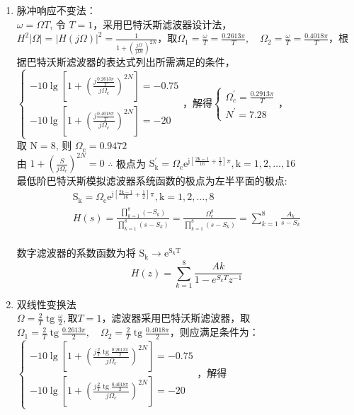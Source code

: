 \documentclass{seuer}
\begin{document}
\begin{enumerate}
	\item 脉冲响应不变法：\\$\omega=\Omega T$, 令 $T=1$，采用巴特沃斯滤波器设计法，$H^2|\Omega|=|H(j \Omega)|^2=\frac{1}{1+\left(\frac{j \Omega}{j \Omega c}\right)^{2 N}}$，取$\Omega_1=\frac{\omega}{T}=\frac{0.2613 \pi}{T}, \quad \Omega_2=\frac{\omega}{T}=\frac{0.4018 \pi}{T}$，根据巴特沃斯滤波器的表达式列出所需满足的条件，\\$\left\{\begin{array}{l}-10 \lg \left[1+\left(\frac{j \frac{0.2613 \pi}{T}}{j \Omega_c}\right)^{2 N}\right]=-0.75 \\ -10 \lg \left[1+\left(\frac{j \frac{0.4018 \pi}{T}}{j \Omega_c}\right)^{2 N}\right]=-20\end{array}\right.$，解得$\left\{\begin{array}{l}\Omega^{\prime}_c=\frac{0.2913 \pi}{T} \\ N^{\prime}=7.28\end{array}\right.$，\\取 $\mathrm{N}=8$, 则 $\Omega_\mathrm{c}=0.9472$
	\\由 $1+\left(\frac{S}{j \Omega_c}\right)^{2 N}=0$
	$\therefore$ 极点为 $\mathrm{S}_{\mathrm{k}}^{\prime}=\Omega_{\mathrm{c}} \mathrm{e}^{\mathrm{j}\left[\frac{2 \mathrm{k}-1}{16}+\frac{1}{2}\right] \pi}, \mathrm{k}=1,2, \ldots,16$
	\\最低阶巴特沃斯模拟滤波器系统函数的极点为左半平面的极点:
	$$
	\begin{gathered}
		\mathrm{S}_{\mathrm{k}}=\Omega_{\mathrm{c}} \mathrm{e}^{\mathrm{j}\left[\frac{2 \mathrm{k}-1}{16}+\frac{1}{2}\right] \pi}, \mathrm{k}=1,2, \ldots, 8 \\
		H(s)=\frac{\prod_{k=1}^8(-S_k)}{\prod_{k=1}^8(s-S_k)}=\frac{\Omega _c^8}{\prod_{k=1}^8(s-S_k)}=\sum_{k=1}^8 \frac{A_k}{s-S_k}
	\end{gathered}
	$$
	\\数字滤波器的系数函数为将 $\mathrm{S_k} \rightarrow \mathrm{e}^{\mathrm{S_kT}}$
	$$
	H(z)=\sum_{k=1}^8 \frac{A k}{1-e^{S_k T} z^{-1}}
	$$
	\item 双线性变换法
	\\$\Omega=\frac{2}{T} \operatorname{tg} \frac{\omega}{2},
	取T=1$，滤波器采用巴特沃斯滤波器，取$\Omega_1=\frac{2}{T} \operatorname{tg} \frac{0.2613 \pi}{2}, \quad \Omega_2=\frac{2}{T} \operatorname{tg} \frac{0.4018 \pi}{2}$，则应满足条件为：$\left\{\begin{array}{l}-10 \lg \left[1+\left(\frac{j \frac{2}{T} \operatorname{tg} \frac{0.2613 \pi}{2}}{j \Omega_c}\right)^{2 N}\right]=-0.75 \\ -10 \lg \left[1+\left(\frac{j \frac{2}{T} \operatorname{tg} \frac{0.4018 \pi}{2}}{j \Omega_c}\right)^{2 N}\right]=-20\end{array}\right.$，解得

\end{enumerate}
\end{document}
